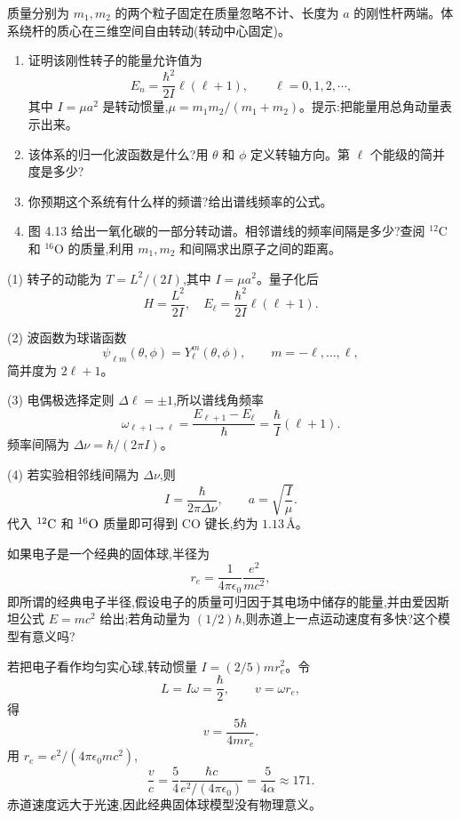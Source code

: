 \begin{question}
质量分别为 $m_1,m_2$ 的两个粒子固定在质量忽略不计、长度为 $a$ 的刚性杆两端。体系绕杆的质心在三维空间自由转动(转动中心固定)。
\begin{enumerate}
\item 证明该刚性转子的能量允许值为
\[
E_n=\frac{\hbar^2}{2I}\ell(\ell+1),\qquad \ell=0,1,2,\cdots,
\]
其中 $I=\mu a^2$ 是转动惯量,$\mu=m_1m_2/(m_1+m_2)$。提示:把能量用总角动量表示出来。
\item 该体系的归一化波函数是什么?用 $\theta$ 和 $\phi$ 定义转轴方向。第 $\ell$ 个能级的简并度是多少?
\item 你预期这个系统有什么样的频谱?给出谱线频率的公式。
\item 图 4.13 给出一氧化碳的一部分转动谱。相邻谱线的频率间隔是多少?查阅 ${}^{12}\mathrm C$ 和 ${}^{16}\mathrm O$ 的质量,利用 $m_1,m_2$ 和间隔求出原子之间的距离。
\end{enumerate}
\end{question}
\begin{solution}

(1) 转子的动能为 $T=L^2/(2I)$,其中 $I=\mu a^2$。量子化后
\[
H=\frac{L^2}{2I},
\quad
E_\ell=\frac{\hbar^2}{2I}\ell(\ell+1).
\]

(2) 波函数为球谐函数
\[
\psi_{\ell m}(\theta,\phi)=Y_\ell^m(\theta,
\phi),\qquad m=-\ell,\ldots,\ell,
\]
简并度为 $2\ell+1$。

(3) 电偶极选择定则 $\Delta\ell=\pm1$,所以谱线角频率
\[
\omega_{\ell+1\to\ell}=\frac{E_{\ell+1}-E_\ell}{\hbar}=\frac{\hbar}{I}(\ell+1).
\]
频率间隔为 $\Delta \nu=\hbar/(2\pi I)$。

(4) 若实验相邻线间隔为 $\Delta\nu$,则
\[
I=\frac{\hbar}{2\pi\Delta\nu},
\qquad
 a=\sqrt{\frac{I}{\mu}}.
\]
代入 ${}^{12}{\rm C}$ 和 ${}^{16}{\rm O}$ 质量即可得到 CO 键长,约为 $1.13\,\text{\AA}$。

\end{solution}

\begin{question}
如果电子是一个经典的固体球,半径为
\[
r_e=\frac{1}{4\pi\epsilon_0}\frac{e^2}{mc^2},
\]
即所谓的经典电子半径,假设电子的质量可归因于其电场中储存的能量,并由爱因斯坦公式 $E=mc^2$ 给出;若角动量为 $(1/2)\hbar$,则赤道上一点运动速度有多快?这个模型有意义吗?
\end{question}
\begin{solution}

若把电子看作均匀实心球,转动惯量 $I=(2/5)mr_e^2$。令
\[
L=I\omega=\frac{\hbar}{2},
\qquad v=\omega r_e,
\]
得
\[
v=\frac{5\hbar}{4mr_e}.
\]
用 $r_e=e^2/(4\pi\epsilon_0mc^2)$,
\[
\frac{v}{c}=\frac{5}{4}\frac{\hbar c}{e^2/(4\pi\epsilon_0)}=\frac{5}{4\alpha}\approx171.
\]
赤道速度远大于光速,因此经典固体球模型没有物理意义。

\end{solution}

